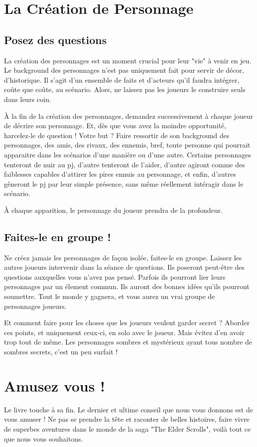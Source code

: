 \chapter{La Création de Personnage}

\section{Posez des questions}

La création des personnages est un moment crucial pour leur "vie" à venir en jeu. Le background des personnages n'est pas uniquement fait pour servir de décor, d'historique. Il s'agit d'un ensemble de faits et d'acteurs qu'il faudra intégrer, coûte que coûte, au scénario. Alors, ne laissez pas les joueurs le construire seuls dans leurs coin.

À la fin de la création des personnages, demandez successivement à chaque joueur de décrire son personnage. Et, dès que vous avez la moindre opportunité, harcelez-le de question ! Votre but ? Faire ressortir de son background des personnages, des amis, des rivaux, des ennemis, bref, toute personne qui pourrait apparaitre dans les scénarios d'une manière ou d'une autre. Certains personnages tenteront de nuir au pj, d'autre tenteront de l'aider, d'autre agiront comme des faiblesses capables d'attirer les pires ennuis au personnage, et enfin, d'autres gêneront le pj par leur simple présence, sans même réellement intéragir dans le scénario. 

À chaque apparition, le personnage du joueur prendra de la profondeur.

\section{Faites-le en groupe !}

Ne créez jamais les personnages de façon isolée, faites-le en groupe. Laissez les autres joueurs intervenir dans la séance de questions. Ils poseront peut-être des questions auxquelles vous n'avez pas pensé. Parfois ils pourront lier leurs personnages par un élement commun. Ils auront des bonnes idées qu'ils pourront soumettre. Tout le monde y gagnera, et vous aurez un vrai groupe de personnages joueurs.

Et comment faire pour les choses que les joueurs veulent garder secret ? Aborder ces points, et uniquement ceux-ci, en solo avec le joueur. Mais évitez d'en avoir trop tout de même. Les personnages sombres et mystérieux ayant tous nombre de sombres secrets, c'est un peu surfait !

\chapter{Amusez vous !}

Le livre touche à sa fin. Le dernier et ultime conseil que nous vous donnons est de vous amuser ! Ne pas se prendre la tête et raconter de belles histoires, faire vivre de superbes aventures dans le monde de la saga "The Elder Scrolls", voilà tout ce que nous vous souhaitons.

     